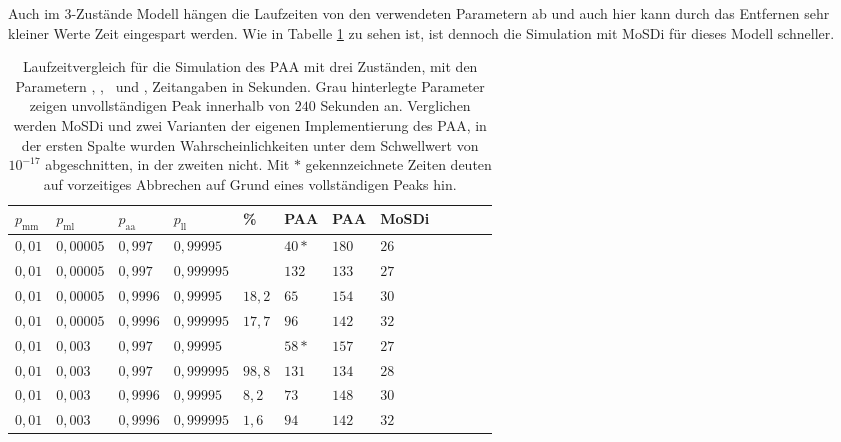 Auch im 3-Zustände Modell hängen die Laufzeiten von den verwendeten Parametern ab und auch hier kann durch das Entfernen sehr kleiner Werte Zeit eingespart werden. Wie in Tabelle \ref{3s_laufzeit_paa} zu sehen ist, ist dennoch die Simulation mit MoSDi für dieses Modell schneller.

\begin{table}[h]
\centering 
\caption[Laufzeitvergleich für die Simulation des PAA mit drei Zuständen]{Laufzeitvergleich für die Simulation des PAA mit drei Zuständen, mit den Parametern \pmm, \pml, \paa\ und \pll, Zeitangaben in Sekunden. Grau hinterlegte Parameter zeigen unvollständigen Peak innerhalb von $240$ Sekunden an. Verglichen werden MoSDi und zwei Varianten der eigenen Implementierung des PAA, in der ersten Spalte wurden Wahrscheinlichkeiten unter dem Schwellwert von $10^{-17}$ abgeschnitten, in der zweiten nicht. Mit $*$ gekennzeichnete Zeiten deuten auf vorzeitiges Abbrechen auf Grund eines vollständigen Peaks hin.}
\label{3s_laufzeit_paa}
\begin{tabular}{|l|l|l|l||l||l|l|l|l|l|l|l|}
\hline
$p_\text{mm}$ & $p_\text{ml}$ & $p_\text{aa}$ & $p_\text{ll}$ & \% & PAA & PAA & MoSDi \\ \hline \hline
$ 0,01 $ & $0,00005$ & $0,997$  & $0,99995$  &&  $40* $ & $180  $ & $26 $  \\ \hline
$ 0,01 $ & $0,00005$ & $0,997$  & $0,999995$ &&  $132  $ & $133  $ & $27 $  \\ \hline
\cellcolor{gray!40}$ 0,01 $ & \cellcolor{gray!40}$0,00005$ & \cellcolor{gray!40}$0,9996$ & \cellcolor{gray!40}$0,99995$  &$18,2$& $65 $ & $154  $ & $30 $  \\ \hline
\cellcolor{gray!40}$ 0,01 $ & \cellcolor{gray!40}$0,00005$ & \cellcolor{gray!40}$0,9996$ & \cellcolor{gray!40}$0,999995$ &$17,7$& $96 $ & $142  $ & $ 32 $  \\ \hline
$ 0,01 $ & $0,003 $  & $0,997$  & $0,99995$  &&  $58*  $ & $157  $ & $27 $  \\ \hline
\cellcolor{gray!40}$ 0,01 $ & \cellcolor{gray!40}$0,003 $  & \cellcolor{gray!40}$0,997$  & \cellcolor{gray!40}$0,999995$ &$98,8$&$131  $ & $134  $ & $ 28 $  \\ \hline
\cellcolor{gray!40}$ 0,01 $ & \cellcolor{gray!40}$0,003 $  & \cellcolor{gray!40}$0,9996$ & \cellcolor{gray!40}$0,99995$  &$8,2$& $73  $ & $148  $ & $ 30  $  \\ \hline
\cellcolor{gray!40}$ 0,01 $ & \cellcolor{gray!40}$0,003 $  & \cellcolor{gray!40}$0,9996$ & \cellcolor{gray!40}$0,999995$ &$1,6$& $94  $ & $142  $ & $32 $  \\ \hline

\end{tabular}
\end{table}
